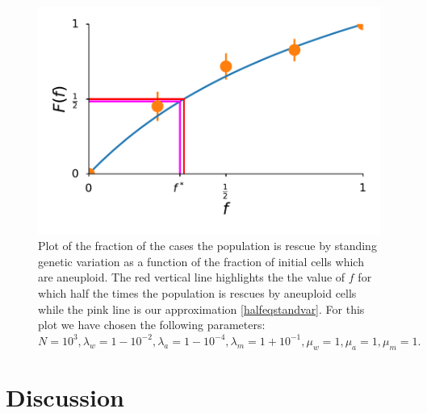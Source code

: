\documentclass[12pt]{extarticle}
\begin{document}
\begin{figure}[!t]
 \vspace*{1\baselineskip}
\includegraphics[width=1\textwidth]{Figures/FractionPlot.pdf}
\caption{Plot of the fraction of the cases the population is rescue by standing genetic variation as a function of the fraction of initial cells which are aneuploid. The red vertical line highlights the the value of $f$ for which half the times the population is rescues by aneuploid cells while the pink line is our approximation \eqref{halfeqstandvar}. For this plot we have chosen the following parameters: $N=10^3, \lambda_w=1-10^{-2}, \lambda_a=1-10^{-4},\lambda_m=1+10^{-1},\mu_w=1,\mu_a=1,\mu_m=1.$}
\label{FractionPlot}
\end{figure}


\section*{Discussion}


\nolinenumbers
%
%
%


\pagebreak
\end{document}
